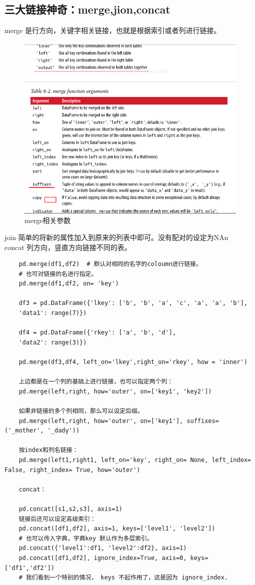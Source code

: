 \documentclass{article}
\begin{document}
\subsection{三大链接神奇：merge,jion,concat}
merge 是行方向，关键字相关链接，也就是根据索引或者列进行链接。
\begin{figure}[htpb]
	\centering
	\includegraphics[width=\linewidth]{fig/a2}
	\caption{merge相关参数}
	\label{fig-merge}
\end{figure}
join 简单的将新的属性加入到原来的列表中即可。没有配对的设定为NAn\\
concat 列方向，竖直方向链接不同的表。\\

\begin{lstlisting}
	pd.merge(df1,df2)  # 默认对相同的名字的coloumn进行链接。
	# 也可对链接的名进行指定。
	pd.merge(df1,df2, on= 'key')
	
	df3 = pd.DataFrame({'lkey': ['b', 'b', 'a', 'c', 'a', 'a', 'b'],
	'data1': range(7)})
	
	df4 = pd.DataFrame({'rkey': ['a', 'b', 'd'],
	'data2': range(3)})
	
	pd.merge(df3,df4, left_on='lkey',right_on='rkey', how = 'inner')
	
	上边都是在一个列的基础上进行链接，也可以指定两个列：
	pd.merge(left,right, how='outer', on=['key1', 'key2'])
	
	如果非链接的多个列相同，那么可以设定后缀。
	pd.merge(left,right, how='outer', on=['key1'], suffixes=('_mother', '_dady'))
	
	按index和列名链接：
	pd.merge(left1,right1, left_on='key', right_on= None, left_index= False, right_index= True, how='outer')
	
	concat：
	
	pd.concat([s1,s2,s3], axis=1)
	链接后还可以设定高级索引：
	pd.concat([df1,df2], axis=1, keys=['level1', 'level2'])
	# 也可以传入字典，字典key 默认作为多层索引。
	pd.concat({'level1':df1, 'level2':df2}, axis=1)
	pd.concat([df1,df2], ignore_index=True, axis=0, keys=['df1','df2'])
	# 我们看到一个特别的情况， keys 不起作用了，这是因为 ignore_index.

	
\end{lstlisting}
\end{document}
